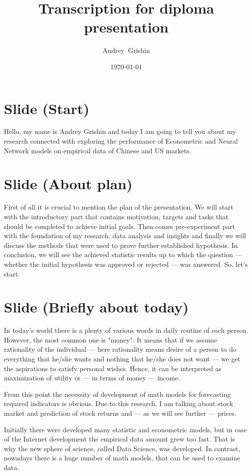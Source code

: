 \documentclass[a4paper, 12pt]{article}
\title{Transcription for diploma presentation}
\author{Andrey~Grishin}
\date{\today}
\begin{document}
	\maketitle
	\section{Slide (Start)}
		Hello, my name is Andrey Grishin and today I am going to tell you about my research connected with exploring the performance of Econometric and Neural Network models on empirical data of Chinese and US markets.
	\section{Slide (About plan)}
		First of all it is crucial to mention the plan of the presentation. We will start with the introductory part that contains motivation, targets and tasks that should be completed to achieve initial goals. Then comes pre-experiment part with the foundation of my research, data analysis and insights and finally we will discuss the methods that were used to prove further established hypothesis. In conclusion, we will see the achieved statistic results up to which the question --- whether the initial hypothesis was approved or rejected --- was answered. So, let's start.
	\section{Slide (Briefly about today)}
		In today's world there is a plenty of various words in daily routine of each person. However, the most common one is "money".  It means that if we assume rationality of the individual --- here rationality means desire of a person to do everything that he/she wants and nothing that he/she does not want --- we get the aspirations to satisfy personal wishes. Hence, it can be interpreted as maximization of utility or --- in terms of money --- income.
		
		From this point the necessity of development of math models for forecasting required indicators is obvious. Due to this research, I am talking about stock market and prediction of stock returns and --- as we will see further --- prices.
		
		Initially there were developed many statistic and econometric models, but in case of the Internet development the empirical data amount grew too fast. That is why the new sphere of science, called Data Science, was developed. In contrast, nowadays there is a huge number of math models, that can be used to examine data. 
		
\end{document}
